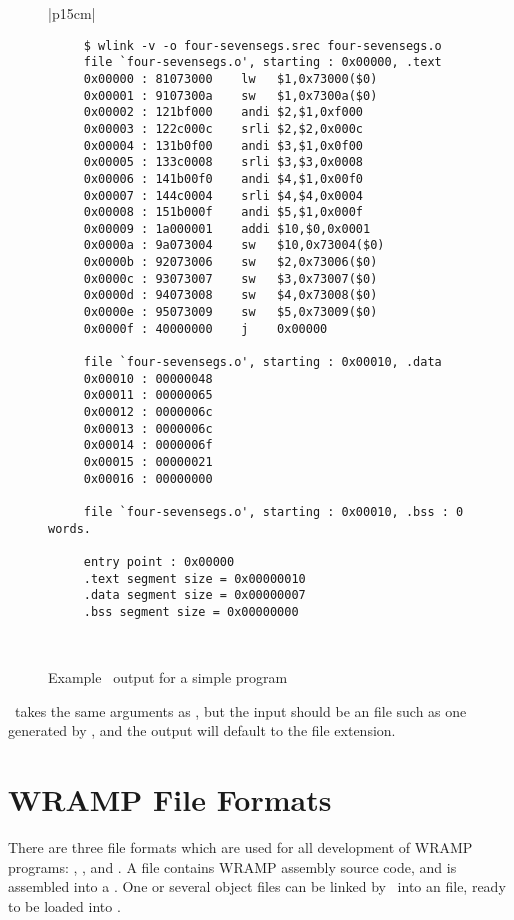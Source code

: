 \begin{figure}[btp]
\begin{center}
\begin{tabular}{|p{15cm}|}
\hline
\begin{verbatim}
     $ wlink -v -o four-sevensegs.srec four-sevensegs.o
     file `four-sevensegs.o', starting : 0x00000, .text
     0x00000 : 81073000    lw	$1,0x73000($0)
     0x00001 : 9107300a    sw	$1,0x7300a($0)
     0x00002 : 121bf000    andi	$2,$1,0xf000
     0x00003 : 122c000c    srli	$2,$2,0x000c
     0x00004 : 131b0f00    andi	$3,$1,0x0f00
     0x00005 : 133c0008    srli	$3,$3,0x0008
     0x00006 : 141b00f0    andi	$4,$1,0x00f0
     0x00007 : 144c0004    srli	$4,$4,0x0004
     0x00008 : 151b000f    andi	$5,$1,0x000f
     0x00009 : 1a000001    addi	$10,$0,0x0001
     0x0000a : 9a073004    sw	$10,0x73004($0)
     0x0000b : 92073006    sw	$2,0x73006($0)
     0x0000c : 93073007    sw	$3,0x73007($0)
     0x0000d : 94073008    sw	$4,0x73008($0)
     0x0000e : 95073009    sw	$5,0x73009($0)
     0x0000f : 40000000    j	0x00000
     
     file `four-sevensegs.o', starting : 0x00010, .data
     0x00010 : 00000048    
     0x00011 : 00000065    
     0x00012 : 0000006c    
     0x00013 : 0000006c    
     0x00014 : 0000006f    
     0x00015 : 00000021    
     0x00016 : 00000000    

     file `four-sevensegs.o', starting : 0x00010, .bss : 0 words.

     entry point : 0x00000
     .text segment size = 0x00000010
     .data segment size = 0x00000007
     .bss segment size = 0x00000000
\end{verbatim}
\\
\hline
\end{tabular}
\end{center}
\caption{Example \wlink\ output for a simple program}
\label{wlink-output}
\end{figure}

\trim\ takes the same arguments as \wasm, but the input should be an
 file such as one generated by \wlink, and the output will default
to the  file extension.

\section{WRAMP File Formats}

There are three file formats which are used for all development of WRAMP
programs: , , and .
A  file contains WRAMP assembly source code, and is assembled into
a  . One or several object files can be linked by
\wlink\ into an  file, ready to be loaded into \WRAMPmon.

